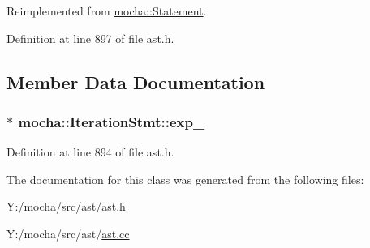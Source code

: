 Reimplemented from \hyperlink{classmocha_1_1_statement_ad0e8c3ef62d21f733eb50a414046bae4}{mocha::Statement}.



Definition at line 897 of file ast.h.



\subsection{Member Data Documentation}
\hypertarget{classmocha_1_1_iteration_stmt_a7e7d57f41145e2892f31b93d345480c1}{
\subsubsection[{exp\_\-}]{$\ast$ {\bf mocha::IterationStmt::exp\_\-}}}
\label{classmocha_1_1_iteration_stmt_a7e7d57f41145e2892f31b93d345480c1}


Definition at line 894 of file ast.h.



The documentation for this class was generated from the following files:\begin{DoxyCompactItemize}
\item 
Y:/mocha/src/ast/\hyperlink{ast_8h}{ast.h}\item 
Y:/mocha/src/ast/\hyperlink{ast_8cc}{ast.cc}\end{DoxyCompactItemize}
